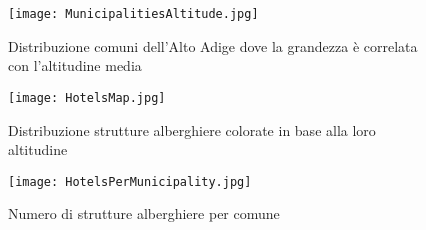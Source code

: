 \begin{figure}[ht]
    \centering
    \texttt{[image: MunicipalitiesAltitude.jpg]}
    \caption{Distribuzione comuni dell'Alto Adige dove la grandezza è correlata con l'altitudine media}
    \label{fig:MunicipalitiesAltitude}
\end{figure}
\begin{figure}[ht]
    \centering
    \texttt{[image: HotelsMap.jpg]}
    \caption{Distribuzione strutture alberghiere colorate in base alla loro altitudine}
    \label{fig:HotelsMap}
\end{figure}
\begin{figure}[ht]
    \centering
    \texttt{[image: HotelsPerMunicipality.jpg]}
    \caption{Numero di strutture alberghiere per comune}
    \label{fig:HotelsMunicipality}
\end{figure}